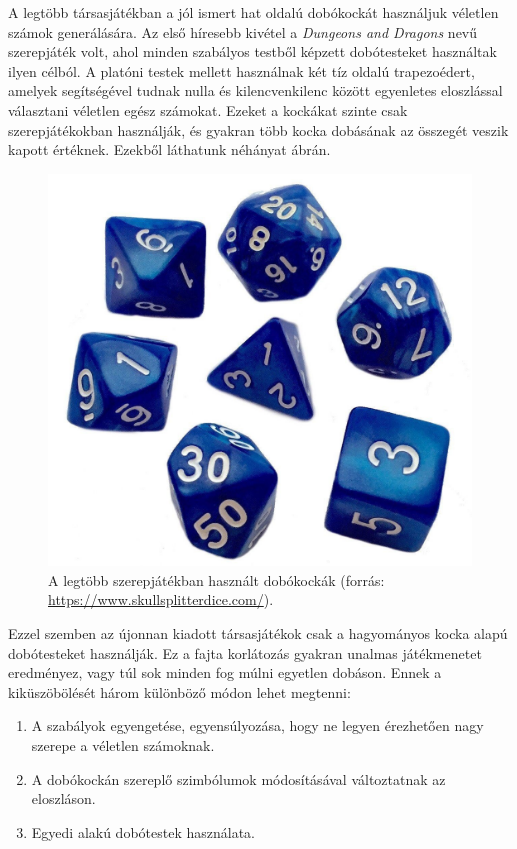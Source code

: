 
A legtöbb társasjátékban a jól ismert hat oldalú dobókockát használjuk véletlen számok generálására.
Az első híresebb kivétel a \textit{Dungeons and Dragons} \cite{dnd} nevű szerepjáték volt, ahol minden szabályos testből képzett dobótesteket használtak ilyen célból.
A platóni testek mellett használnak két tíz oldalú trapezoédert, amelyek segítségével tudnak nulla és kilencvenkilenc között egyenletes eloszlással választani véletlen egész számokat.
Ezeket a kockákat szinte csak szerepjátékokban használják, és gyakran több kocka dobásának az összegét veszik kapott értéknek.
Ezekből láthatunk néhányat  ábrán.

\begin{figure}[h!]
	\centering
	\includegraphics[scale=0.15]{images/diceset.png}
	\caption{A legtöbb szerepjátékban használt dobókockák (forrás: \url{https://www.skullsplitterdice.com/}).}
	\label{fig:diceset}
\end{figure}

Ezzel szemben az újonnan kiadott társasjátékok csak a hagyományos kocka alapú dobótesteket használják.
Ez a fajta korlátozás gyakran unalmas játékmenetet eredményez, vagy túl sok minden fog múlni egyetlen dobáson.
Ennek a kiküszöbölését három különböző módon lehet megtenni:
\begin{enumerate}
\item A szabályok egyengetése, egyensúlyozása, hogy ne legyen érezhetően nagy szerepe a véletlen számoknak.
\item A dobókockán szereplő szimbólumok módosításával változtatnak az eloszláson.
\item Egyedi alakú dobótestek használata.
\end{enumerate}

